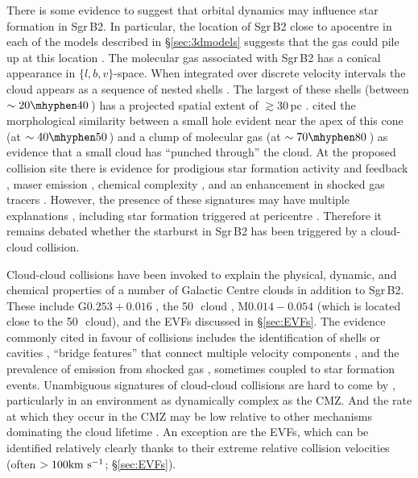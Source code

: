 There is some evidence to suggest that orbital dynamics may influence star formation in Sgr\,B2.
In particular, the location of Sgr\,B2 close to apocentre in each of the models described in \S\ref{sec:3dmodels} suggests that the gas could pile up at this location \citep{Hatchfield2021}.
The molecular gas associated with Sgr\,B2 has a conical appearance in $\{l,b,v\}$-space. When integrated over discrete velocity intervals the cloud appears as a sequence of nested shells \citep{Henshaw2016b, Armijos-Abendano2020}. 
The largest of these shells (between $\sim20\mhyphen40$\,\kms) has a projected spatial extent of $\gtrsim30$\,pc \citep{Bally1988}. 
\citet[][see also \citealp{Sato2000}]{Hasegawa1994} cited the morphological similarity between a small hole evident near the apex of this cone (at $\sim40\mhyphen50$\,\kms) and a clump of molecular gas (at $\sim70\mhyphen80$\,\kms) as evidence that a small cloud has ``punched through'' the cloud. 
At the proposed collision site there is evidence for prodigious star formation activity and feedback \citep{Tsuboi2015b}, maser emission \citep{Sato2000}, chemical complexity \citep{Zeng2020, Colzi2022}, and an enhancement in shocked gas tracers \citep{Armijos-Abendano2020}.
However, the presence of these signatures may have multiple explanations \citep{Henshaw2016b, Kruijssen2019}, including star formation triggered at pericentre \citep{Longmore2013a}.
Therefore it remains debated whether the starburst in Sgr\,B2 has been triggered by a cloud-cloud collision.

Cloud-cloud collisions have been invoked to explain the physical, dynamic, and chemical properties of a number of Galactic Centre clouds in addition to Sgr\,B2. These include G$0.253+0.016$ \citep{Higuchi2014, Johnston2014}, the 50\,\kms \ cloud \citep{Tsuboi2015a}, M$0.014-0.054$ \citep{Tsuboi2021} (which is located close to the 50\,\kms \ cloud), and the EVFs discussed in \S\ref{sec:EVFs}. The evidence commonly cited in favour of collisions includes the identification of shells or cavities \citep{Hasegawa1994, Sato2000, Higuchi2014,Tsuboi2015a}, ``bridge features'' that connect multiple velocity components \citep{Johnston2014, Tsuboi2021}, and the prevalence of emission from shocked gas \citep{Zeng2020, Armijos-Abendano2020}, sometimes coupled to star formation events. Unambiguous signatures of cloud-cloud collisions are hard to come by \citep[though progress is being made;][]{Haworth2015,Fukui2021,Priestley2021}, particularly in an environment as dynamically complex as the CMZ. And the rate at which they occur in the CMZ may be low relative to other mechanisms dominating the cloud lifetime \citep[e.g. gravitational instability;][]{Jeffreson2018a}. An exception are the EVFs, which can be identified relatively clearly thanks to their extreme relative collision velocities (often $>100\mbox{${\rm km}~{\rm s}^{-1}$}$; \S\ref{sec:EVFs}).

